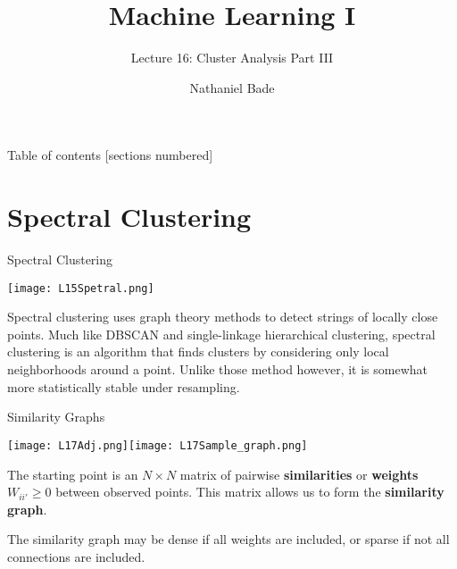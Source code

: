 \documentclass[10pt, table, dvipsnames,xcdraw,handout]{beamer}
\title{Machine Learning I}
\subtitle{Lecture 16: Cluster Analysis Part III}
\date{}
\author{Nathaniel Bade}
\institute{Northeastern University Department of Mathematics}
\begin{document}
\maketitle

\begin{frame}{Table of contents}
  [sections numbered]
  \tableofcontents[hideallsubsections]
\end{frame}




%
% 
%
%
%
%
%



\section{Spectral Clustering}
\begin{frame}[fragile]{Spectral Clustering}
  \begin{minipage}[t][0.5\textheight][t]{\textwidth}
	\centering \texttt{[image: L15Spetral.png]} 
  \end{minipage}
  \vfill
\begin{minipage}[t][0.5\textheight][t]{\textwidth}
Spectral clustering uses graph theory methods to detect strings of locally close points. Much like DBSCAN and single-linkage hierarchical clustering, spectral clustering is an algorithm that finds clusters by considering only local neighborhoods around a point. \pause Unlike those method however, it is somewhat more statistically stable under resampling.
\end{minipage}
\end{frame}



\begin{frame}[fragile]{Similarity Graphs}
  \begin{minipage}[t][0.5\textheight][t]{\textwidth}
	\centering \texttt{[image: L17Adj.png]}\texttt{[image: L17Sample\_graph.png]} 
  \end{minipage}
  \vfill
\begin{minipage}[t][0.5\textheight][t]{\textwidth}
The starting point is an $N\times N$ matrix of pairwise \textbf{similarities} or \textbf{weights} $W_{ii'} \geq 0$ between observed points. This matrix allows us to form the \textbf{similarity graph}.\pause 

The similarity graph may be dense if all weights are included, or sparse if not all connections are included. 
\end{minipage}
\end{frame}
\end{document}
